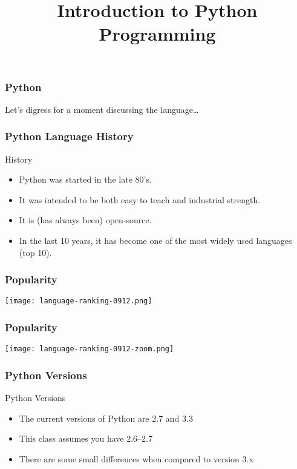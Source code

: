 
\title[Python I]{Introduction to Python Programming}


\frame{\maketitle}


\begin{frame}[fragile]
\frametitle{Python}

Let's digress for a moment discussing the language\ldots
\end{frame}


\begin{frame}[fragile]
\frametitle{Python Language History}

\begin{block}{History}
\begin{itemize}
\item Python was started in the late 80's.
\item It was intended to be both \alert{easy to teach} and \alert{industrial strength}.
\item It is (has always been) open-source.
\item In the last 10 years, it has become one of the most widely used languages (top 10).
\end{itemize}
\end{block}
\end{frame}

\begin{frame}
\frametitle{Popularity}

\centering
\texttt{[image: language-ranking-0912.png]}

\end{frame}

\begin{frame}
\frametitle{Popularity}

\centering
\texttt{[image: language-ranking-0912-zoom.png]}

\end{frame}
\begin{frame}
\frametitle{Python Versions}

\begin{block}{Python Versions}
\begin{itemize}
\item The current versions of Python are \alert{2.7} and \alert{3.3}
\item This class assumes you have 2.6--2.7
\item There are some small differences when compared to version 3.x
\end{itemize}
\end{block}

\end{frame}



